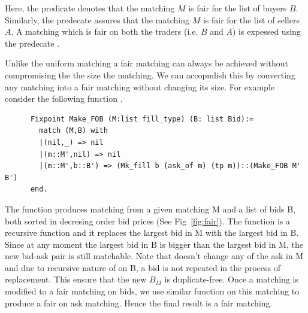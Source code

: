 \documentclass[a4paper,UKenglish,cleveref, autoref]{lipics-v2019}
\begin{document}
\begin{definition}
 \end{definition}
\begin{definition}
\end{definition}
\begin{definition}
\end{definition}

Here, the predicate   denotes that the matching $M$  is fair for the list of buyers $B$. Similarly,  the predecate  assures that the matching $M$  is fair for the list of sellers $A$.  A matching which is fair on both the traders (i.e. $B$ and $A$) is expessed using the predecate .

Unlike the uniform matching a fair matching can always be achieved without compromising the the size the matching. We can accopmlish this by converting any matching into a fair matching without changing its size. For example consider the following function .

\begin{verbatim}
	  Fixpoint Make_FOB (M:list fill_type) (B: list Bid):=
	    match (M,B) with 
	    |(nil,_) => nil
	    |(m::M',nil) => nil
	    |(m::M',b::B') => (Mk_fill b (ask_of m) (tp m))::(Make_FOB M' B')
	  end.
\end{verbatim}

The function  produces  matching from a given matching M and a list of bids B, both sorted in decresing order bid prices (See Fig~\ref{fig:fair}). The function  is a recursive function and it replaces the largest bid in M with the largest bid in B. Since at any moment the largest bid in B is bigger than the largest bid in M, the new bid-ask pair is still matchable. Note that  doesn't change any of the ask in M and due to recursive nature of  on B, a bid is not repeated in the process of replacement.  This ensure that the new $B_M$ is duplicate-free. Once a matching is modified to a fair matching on bids, we use similar function  on this matching to produce a fair on ask matching. Hence the final result is a fair matching. 
\end{document}
